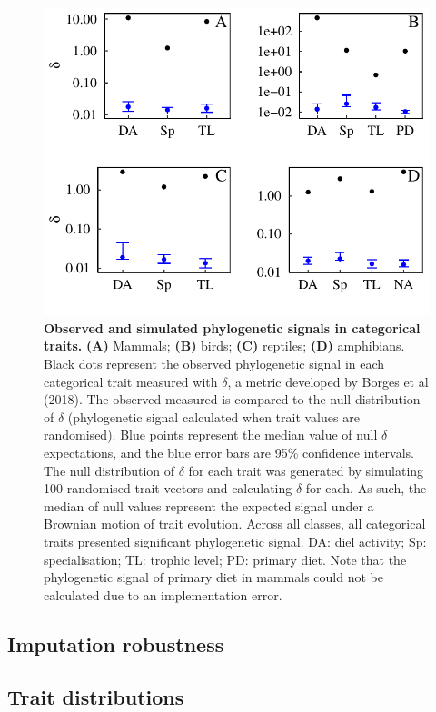 \documentclass[11pt]{article}
\begin{document}
\begin{figure}[h!]
\centering
\includegraphics[scale=0.75]{figures/Physignal/Allclasses}
\caption[Observed and simulated phylogenetic signals in categorical traits]{\textbf{Observed and simulated phylogenetic signals in categorical traits.} \textbf{(A)} Mammals; \textbf{(B)} birds; \textbf{(C)} reptiles; \textbf{(D)} amphibians. Black dots represent the observed phylogenetic signal in each categorical trait measured with $\delta$, a metric developed by Borges et al (2018). The observed measured is compared to the null distribution of $\delta$ (phylogenetic signal calculated when trait values are randomised). Blue points represent the median value of null $\delta$ expectations, and the blue error bars are 95\% confidence intervals. The null distribution of $\delta$ for each trait was generated by simulating 100 randomised trait vectors and calculating $\delta$ for each. As such, the median of null values represent the expected signal under a Brownian motion of trait evolution. Across all classes, all categorical traits presented significant phylogenetic signal. DA: diel activity; Sp: specialisation; TL: trophic level; PD: primary diet. Note that the phylogenetic signal of primary diet in mammals could not be calculated due to an implementation error.}
\label{Catphysig}
\end{figure}




\pagebreak
\subsection{Imputation robustness}

\subsection{Trait distributions}
\end{document}
